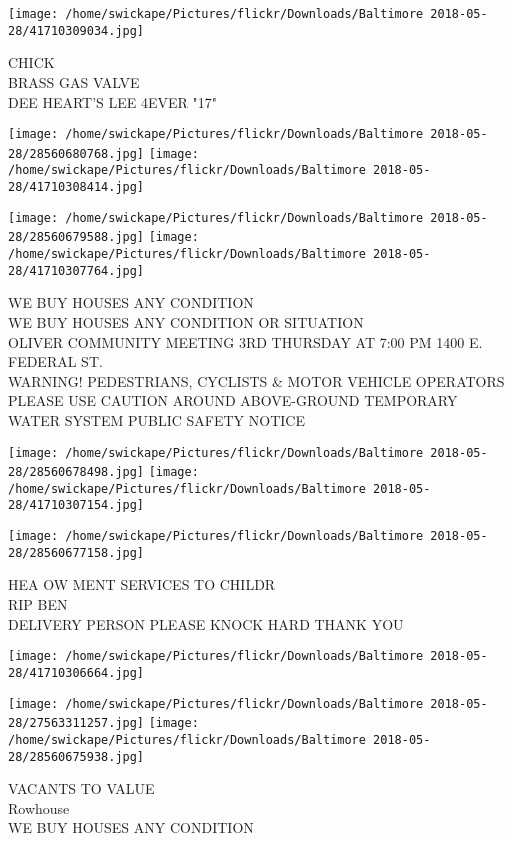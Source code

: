 \documentclass[10pt,letterpaper]{article}
\begin{document}
\vspace{0.25in}
\texttt{[image: /home/swickape/Pictures/flickr/Downloads/Baltimore 2018-05-28/41710309034.jpg]}

CHICK\\
BRASS GAS VALVE\\
DEE HEART'S LEE 4EVER "17"
\pagebreak

\texttt{[image: /home/swickape/Pictures/flickr/Downloads/Baltimore 2018-05-28/28560680768.jpg]}
\texttt{[image: /home/swickape/Pictures/flickr/Downloads/Baltimore 2018-05-28/41710308414.jpg]}

\texttt{[image: /home/swickape/Pictures/flickr/Downloads/Baltimore 2018-05-28/28560679588.jpg]}
\texttt{[image: /home/swickape/Pictures/flickr/Downloads/Baltimore 2018-05-28/41710307764.jpg]}

WE BUY HOUSES ANY CONDITION\\
WE BUY HOUSES ANY CONDITION OR SITUATION\\
OLIVER COMMUNITY MEETING 3RD THURSDAY AT 7:00 PM 1400 E. FEDERAL ST.\\
WARNING!  PEDESTRIANS, CYCLISTS \& MOTOR VEHICLE OPERATORS PLEASE USE CAUTION AROUND ABOVE{-}GROUND TEMPORARY WATER SYSTEM PUBLIC SAFETY NOTICE
\pagebreak

\texttt{[image: /home/swickape/Pictures/flickr/Downloads/Baltimore 2018-05-28/28560678498.jpg]}
\texttt{[image: /home/swickape/Pictures/flickr/Downloads/Baltimore 2018-05-28/41710307154.jpg]}

\texttt{[image: /home/swickape/Pictures/flickr/Downloads/Baltimore 2018-05-28/28560677158.jpg]}

HEA OW MENT SERVICES TO CHILDR\\
RIP BEN\\
DELIVERY PERSON PLEASE KNOCK HARD THANK YOU
\pagebreak

\texttt{[image: /home/swickape/Pictures/flickr/Downloads/Baltimore 2018-05-28/41710306664.jpg]}

\vspace{0.25in}
\texttt{[image: /home/swickape/Pictures/flickr/Downloads/Baltimore 2018-05-28/27563311257.jpg]}
\texttt{[image: /home/swickape/Pictures/flickr/Downloads/Baltimore 2018-05-28/28560675938.jpg]}

VACANTS TO VALUE\\
Rowhouse\\
WE BUY HOUSES ANY CONDITION
\pagebreak
\end{document}
